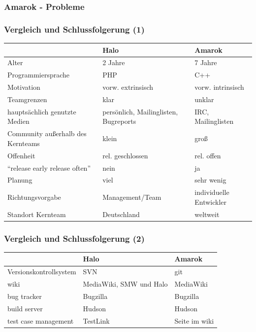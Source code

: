 \documentclass{beamer}
\begin{document}
\begin{frame}
\frametitle{Amarok - Probleme}
\begin{center}
\end{center}
\end{frame}

\begin{frame}
\frametitle{Vergleich und Schlussfolgerung (1)}
\begin{tabularx}{\textwidth}{|X|X|X|}
\hline
 & Halo & Amarok \\
\hline \hline
Alter & 2 Jahre & 7 Jahre \\
\hline
Programmiersprache & PHP & C++ \\
\hline
Motivation & vorw. extrinsisch & vorw. intrinsisch \\
\hline
Teamgrenzen & klar & unklar\\
\hline
haupts\"achlich genutzte Medien & pers\"onlich, Mailinglisten, Bugreports & IRC, Mailinglisten \\
\hline
Community au\ss erhalb des Kernteams & klein & gro\ss \\
\hline
Offenheit & rel. geschlossen & rel. offen \\
\hline
``release early release often'' & nein & ja \\
\hline
Planung & viel & sehr wenig \\
\hline
Richtungsvorgabe & Management/Team & individuelle Entwickler \\
\hline
Standort Kernteam & Deutschland & weltweit \\
\hline
\end{tabularx}
\end{frame}

\begin{frame}
\frametitle{Vergleich und Schlussfolgerung (2)}
\begin{tabularx}{\textwidth}{|X|X|X|}
\hline
 & Halo & Amarok\\
\hline \hline
Versionskontrollsystem & SVN & git\\
\hline
wiki & MediaWiki, SMW und Halo & MediaWiki\\
\hline
bug tracker & Bugzilla & Bugzilla\\
\hline
build server & Hudson & Hudson\\
\hline
test case management & TestLink & Seite im wiki\\
\hline
\end{tabularx}
\end{frame}
\end{document}
